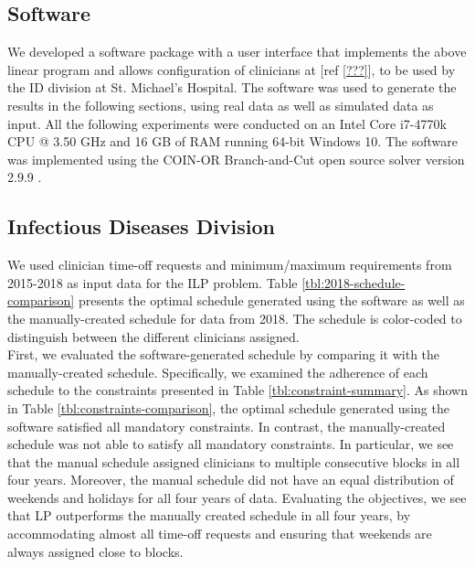 \subsection{Software}
We developed a software package with a user interface that implements the above
linear program and allows configuration of clinicians at [ref \ref{???}], to be
used by the ID division at St. Michael's Hospital. The software was used to
generate the results in the following sections, using real data as well as
simulated data as input. All the following experiments were conducted on an
Intel Core i7-4770k CPU @ 3.50 GHz and 16 GB of RAM running 64-bit Windows 10.
The software was implemented using the COIN-OR Branch-and-Cut open source solver
version 2.9.9 \cite{johnjforrest_coin-or/cbc:_2019}.

\subsection{Infectious Diseases Division}  %
We used clinician time-off requests and minimum/maximum requirements from
2015-2018 as input data for the ILP problem. Table
\ref{tbl:2018-schedule-comparison} presents the optimal schedule generated using
the software as well as the manually-created schedule for data from 2018. The
schedule is color-coded to distinguish between the different clinicians
assigned. \\



First, we evaluated the software-generated schedule by comparing it with the
manually-created schedule. Specifically, we examined the adherence of each
schedule to the constraints presented in Table \ref{tbl:constraint-summary}. As
shown in Table \ref{tbl:constraints-comparison}, the optimal schedule generated
using the software satisfied all mandatory constraints. In contrast, the
manually-created schedule was not able to satisfy all mandatory constraints. In
particular, we see that the manual schedule assigned clinicians to multiple
consecutive blocks in all four years. Moreover, the manual schedule did not have
an equal distribution of weekends and holidays for all four years of data.
Evaluating the objectives, we see that LP outperforms the manually created
schedule in all four years, by accommodating almost all time-off requests and
ensuring that weekends are always assigned close to blocks. \\

